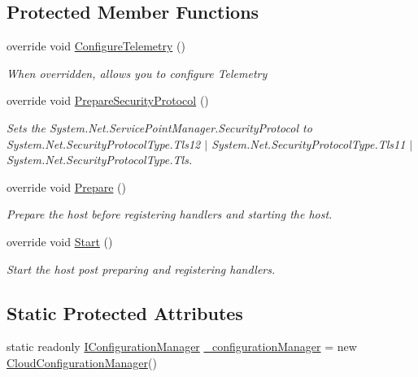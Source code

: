 \subsection*{Protected Member Functions}
\begin{DoxyCompactItemize}
\item 
override void \hyperlink{classCqrs_1_1Azure_1_1ConfigurationManager_1_1TelemetryCoreHost_abcb4e14f33f2b85b95a2b80c4555748a_abcb4e14f33f2b85b95a2b80c4555748a}{Configure\+Telemetry} ()
\begin{DoxyCompactList}\small\item\em When overridden, allows you to configure Telemetry \end{DoxyCompactList}\item 
override void \hyperlink{classCqrs_1_1Azure_1_1ConfigurationManager_1_1TelemetryCoreHost_a0e920d0139b12319847f8ec1deb12f3b_a0e920d0139b12319847f8ec1deb12f3b}{Prepare\+Security\+Protocol} ()
\begin{DoxyCompactList}\small\item\em Sets the System.\+Net.\+Service\+Point\+Manager.\+Security\+Protocol to System.\+Net.\+Security\+Protocol\+Type.\+Tls12 $\vert$ System.\+Net.\+Security\+Protocol\+Type.\+Tls11 $\vert$ System.\+Net.\+Security\+Protocol\+Type.\+Tls. \end{DoxyCompactList}\item 
override void \hyperlink{classCqrs_1_1Azure_1_1ConfigurationManager_1_1TelemetryCoreHost_a620cb9c1ceb78a8f23b45ae749199fd4_a620cb9c1ceb78a8f23b45ae749199fd4}{Prepare} ()
\begin{DoxyCompactList}\small\item\em Prepare the host before registering handlers and starting the host. \end{DoxyCompactList}\item 
override void \hyperlink{classCqrs_1_1Azure_1_1ConfigurationManager_1_1TelemetryCoreHost_a37c8e3f829743d6be1108b3fd8a5a3e7_a37c8e3f829743d6be1108b3fd8a5a3e7}{Start} ()
\begin{DoxyCompactList}\small\item\em Start the host post preparing and registering handlers. \end{DoxyCompactList}\end{DoxyCompactItemize}
\subsection*{Static Protected Attributes}
\begin{DoxyCompactItemize}
\item 
static readonly \hyperlink{interfaceCqrs_1_1Configuration_1_1IConfigurationManager}{I\+Configuration\+Manager} \hyperlink{classCqrs_1_1Azure_1_1ConfigurationManager_1_1TelemetryCoreHost_a17dab2f4d92bff926b54f9d58238de6b_a17dab2f4d92bff926b54f9d58238de6b}{\+\_\+configuration\+Manager} = new \hyperlink{classCqrs_1_1Azure_1_1ConfigurationManager_1_1CloudConfigurationManager}{Cloud\+Configuration\+Manager}()
\end{DoxyCompactItemize}
